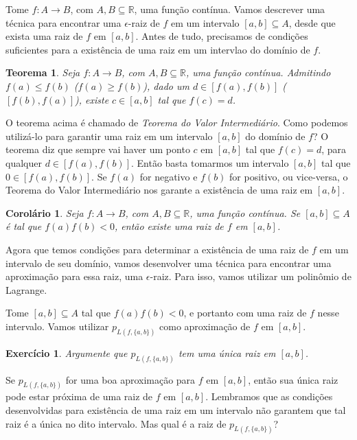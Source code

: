 \documentclass[]{article}
\newtheorem{teorema}{Teorema}
\newtheorem{corolario}{Corolário}
\newtheorem{exercicio}{Exercício}
\numberwithin{equation}{section}
\begin{document}
Tome $f : A \to B$, com $A, B \subseteq \mathbb{R}$, uma função contínua. Vamos descrever uma técnica para encontrar uma $\epsilon$-raiz de $f$ em um intervalo $[a, b] \subseteq A$, desde que exista uma raiz de $f$ em $[a, b]$. Antes de tudo, precisamos de condições suficientes para a existência de uma raiz em um intervlao do domínio de $f$.

\begin{teorema}
	Seja $f : A \to B$, com $A, B \subseteq \mathbb{R}$, uma função contínua. Admitindo $f(a) \leq f(b)$ ($f(a) \geq f(b)$), dado um $d \in [f(a), f(b)]$ ($[f(b), f(a)]$), existe $c \in [a, b]$ tal que $f(c) = d$.
\end{teorema}

O teorema acima é chamado de \emph{Teorema do Valor Intermediário}. Como podemos utilizá-lo para garantir uma raiz em um intervalo $[a, b]$ do domínio de $f$? O teorema diz que sempre vai haver um ponto $c$ em $[a, b]$ tal que $f(c) = d$, para qualquer $d \in [f(a), f(b)]$. Então basta tomarmos um intervalo $[a, b]$ tal que $0 \in [f(a), f(b)]$. Se $f(a)$ for negativo e $f(b)$ for positivo, ou vice-versa, o Teorema do Valor Intermediário nos garante a existência de uma raiz em $[a, b]$.

\begin{corolario}
	Seja $f : A \to B$, com $A, B \subseteq \mathbb{R}$, uma função contínua. Se $[a, b] \subseteq A$ é tal que $f(a)f(b) < 0$, então existe uma raiz de $f$ em $[a, b]$.
\end{corolario}

Agora que temos condições para determinar a existência de uma raiz de $f$ em um intervalo de seu domínio, vamos desenvolver uma técnica para encontrar uma aproximação para essa raiz, uma $\epsilon$-raiz. Para isso, vamos utilizar um polinômio de Lagrange.

Tome $[a, b] \subseteq A$ tal que $f(a)f(b) < 0$, e portanto com uma
raiz de $f$ nesse intervalo. Vamos utilizar $p_{L(f, \{a,
  b\})}$ como aproximação de $f$ em $[a, b]$.

\begin{exercicio}
	Argumente que $p_{L(f, \{a, b\})}$ tem uma única raiz em $[a, b]$.
\end{exercicio}

Se $p_{L(f, \{a, b\})}$ for uma boa aproximação para $f$ em $[a, b]$, então sua única raiz pode estar próxima de uma raiz de $f$ em $[a, b]$. Lembramos que as condições desenvolvidas para existência de uma raiz em um intervalo não garantem que tal raiz é a única no dito intervalo. Mas qual é a raiz de $p_{L(f, \{a, b\})}$?
\end{document}
